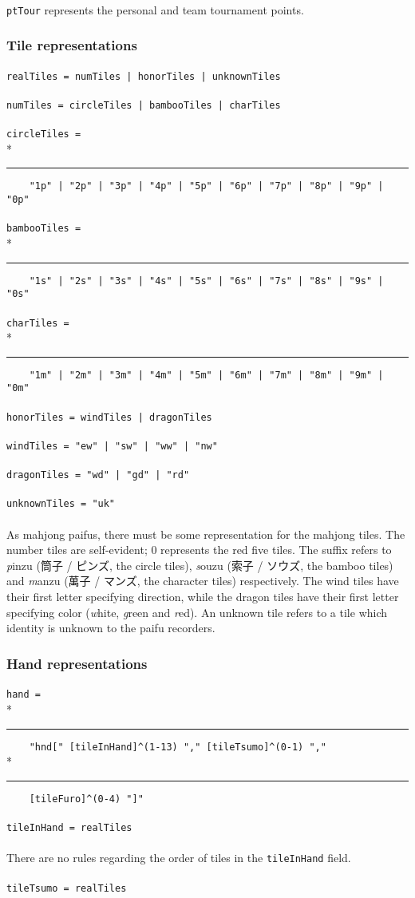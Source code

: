\documentclass[%
	a4paper%
	,10pt%
	,twoside%
	,notitlepage%
]{article}%
\newcommand*{\ruleSymbol}{\textjapanese{⚠}}%
\newcommand*{\ruleMargin}{\marginpar{\flushright{}\ruleSymbol{}}}%
\newcommand*{\rulePar}{\paragraph*{\ruleMargin{}}}%
\newcommand*{\indentRule}{\rule{10pt}{0pt}}%
\begin{document}
			\paragraph*{}\lstinline/ptTour/ represents the personal and team tournament points. %
		\subsubsection{Tile representations}\label{subsubsec:tile}%
			\rulePar{}\lstinline/realTiles = numTiles | honorTiles | unknownTiles/%
			\rulePar{}\lstinline/numTiles = circleTiles | bambooTiles | charTiles/%
			\rulePar{}\lstinline/circleTiles = /\\*{}%
			\indentRule{}\lstinline/    "1p" | "2p" | "3p" | "4p" | "5p" | "6p" | "7p" | "8p" | "9p" | "0p"/%
			\rulePar{}\lstinline/bambooTiles = /\\*{}%
			\indentRule{}\lstinline/    "1s" | "2s" | "3s" | "4s" | "5s" | "6s" | "7s" | "8s" | "9s" | "0s"/%
			\rulePar{}\lstinline/charTiles = /\\*{}%
			\indentRule{}\lstinline/    "1m" | "2m" | "3m" | "4m" | "5m" | "6m" | "7m" | "8m" | "9m" | "0m"/%
			\rulePar{}\lstinline/honorTiles = windTiles | dragonTiles/%
			\rulePar{}\lstinline/windTiles = "ew" | "sw" | "ww" | "nw"/%
			\rulePar{}\lstinline/dragonTiles = "wd" | "gd" | "rd"/%
			\rulePar{}\lstinline/unknownTiles = "uk"/%
			\paragraph*{}As mahjong paifus, there must be some representation for the mahjong tiles. The number tiles are self-evident; 0 represents the red five tiles. The suffix refers to \textit{p\/}inzu (\textjapanese{筒子} / \textjapanese{ピンズ}, the circle tiles), \textit{s\/}ouzu (\textjapanese{索子} / \textjapanese{ソウズ}, the bamboo tiles) and \textit{m\/}anzu (\textjapanese{萬子} / \textjapanese{マンズ}, the character tiles) respectively. The wind tiles have their first letter specifying direction, while the dragon tiles have their first letter specifying color (\textit{w\/}hite, \textit{g\/}reen and \textit{r\/}ed). An unknown tile refers to a tile which identity is unknown to the paifu recorders. %
		\subsubsection{Hand representations}\label{subsubsec:hand}%
			\rulePar{}\lstinline/hand = /\\*{}%
			\indentRule{}\lstinline/    "hnd[" [tileInHand]^(1-13) "," [tileTsumo]^(0-1) "," /\\*{}%
			\indentRule{}\lstinline/    [tileFuro]^(0-4) "]"/%
			\rulePar{}\lstinline/tileInHand = realTiles/%
			\rulePar{}There are no rules regarding the order of tiles in the \lstinline/tileInHand/ field. %
			\rulePar{}\lstinline/tileTsumo = realTiles/%
\end{document}
